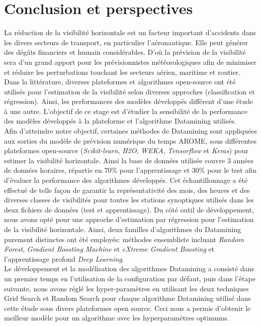 \chapter*{Conclusion et perspectives}
\label{chap:conclusion}
La réduction de la visibilité horizontale est un facteur important d'accidents dans les divers secteurs de transport, en particulier l'aéronautique. Elle peut générer des dégâts financiers et humain considérables. D'où la prévision de la visibilité sera  d’un  grand  apport  pour  les  prévisionnistes météorologiques afin de minimiser et réduire les perturbations touchant les secteurs aérien, maritime et routier. Dans la littérature, diverses plateformes et algorithmes open-source ont été utilisés pour l’estimation de la visibilité selon diverses approches  (classification  et  régression). Ainsi, les performances des modèles développés différent d’une étude à une autre. L'objectif de ce stage est d'étudier la sensibilité de la performance des modèles développés à la plateforme et l'algorithme Datamining utilisés.\\


Afin d'atteindre notre objectif, certaines méthodes de Datamining sont appliquées aux sorties du modèle de prévision numérique du temps AROME, sous différentes plateformes open-source (\textit{Scikit-learn}, \textit{H2O}, \textit{WEKA}, \textit{Tensorflow} et \textit{Keras}) pour estimer la visibilité horizontale. Ainsi la base de données utilisée couvre 3 années de données horaires, répartie en 70\% pour l’apprentissage et 30\% pour le test afin d'évaluer la performance des algorithmes développés. Cet échantillonnage a été effectué de telle façon de garantir la représentativité des mois, des heures et des diverses classes de visibilités pour toutes les stations synoptiques utilisés dans les deux fichiers de données (test et apprentissage). Du côté outil de développement, nous avons opté pour une approche d'estimation par régression pour l'estimation de la visibilité horizontale. Ainsi, deux familles d'algorithmes du Datamining purement distinctes ont été employés: méthodes ensembliste incluant \textit{Random Forest}, \textit{Gradient Boosting Machine} et \textit{eXtreme Gradient Boosting} et l'apprentissage profond \textit{Deep Learning}.\\


Le développement et la modélisation des algorithmes Datamining a consisté dans un premier temps en l'utilisation de la configuration par défaut, puis dans l'étape suivante, nous avons réglé les hyper-paramètres en utilisant les deux techniques Grid Search et Random Search pour chaque algorithme Datamining utilisé dans cette étude sous divers plateformes open source. Ceci nous a permis d’obtenir le meilleur modèle pour un algorithme avec les hyperparamètres optimums.\\


